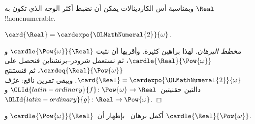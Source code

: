 \documentclass[../../../include/open-logic-section]{subfiles}
\begin{document}
وبمناسبة أس الكاردينالات يمكن أن نضبط أكثر الوجه الذي تكون به
$\Real$ !!{nonenumerable}.

\begin{thm}
$\card{\Real} = \cardexpo{\OLMathNumeral{2}}{\omega}$.
\end{thm}

\begin{proof}[مخطط البرهان]
لهذا براهين كثيرة. وأقربها أن نثبت
$\cardle{\Pow{\omega}}{\Real}$ و$\cardle{\Real}{\Pow{\omega}}$، ثم
نستعمل شرودر--برنشتاين فنحصل على
$\cardeq{\Real}{\Pow{\omega}}$، ثم
 فنستنتج
$\card{\Real} = \cardexpo{\OLMathNumeral{2}}{\omega}$. ويبقى تمرين نافع: عرّف
دالتين حقنيتين~$\OLId{latin-ordinary}{f} \colon \Pow{\omega} \to \Real$ و
$\OLId{latin-ordinary}{g} \colon \Real \to \Pow{\omega}$.
\end{proof}

\begin{prob}
أكمل برهان~ بإظهار
أن~$\cardle{\Pow{\omega}}{\Real}$ و
$\cardle{\Real}{\Pow{\omega}}$.
\end{prob}
\end{document}
